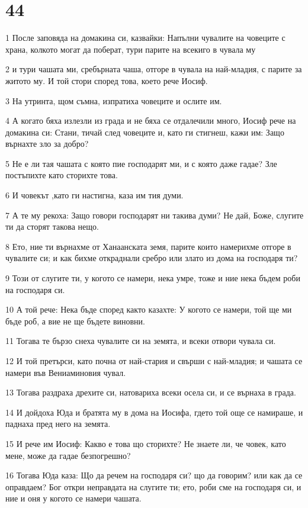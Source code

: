 \chapter{44}

\par 1 После заповяда на домакина си, казвайки: Напълни чувалите на човеците с храна, колкото могат да поберат, тури парите на всекиго в чувала му
\par 2 и тури чашата ми, сребърната чаша, отгоре в чувала на най-младия, с парите за житото му. И той стори според това, което рече Иосиф.
\par 3 На утринта, щом съмна, изпратиха човеците и ослите им.
\par 4 А когато бяха излезли из града и не бяха се отдалечили много, Иосиф рече на домакина си: Стани, тичай след човеците и, като ги стигнеш, кажи им: Защо върнахте зло за добро?
\par 5 Не е ли тая чашата с която пие господарят ми, и с която даже гадае? Зле постъпихте като сторихте това.
\par 6 И човекът ,като ги настигна, каза им тия думи.
\par 7 А те му рекоха: Защо говори господарят ни такива думи? Не дай, Боже, слугите ти да сторят такова нещо.
\par 8 Ето, ние ти върнахме от Ханаанската земя, парите които намерихме отгоре в чувалите си; и как бихме откраднали сребро или злато из дома на господаря ти?
\par 9 Този от слугите ти, у когото се намери, нека умре, тоже и ние нека бъдем роби на господаря си.
\par 10 А той рече: Нека бъде според както казахте: У когото се намери, той ще ми бъде роб, а вие не ще бъдете виновни.
\par 11 Тогава те бързо снеха чувалите си на земята, и всеки отвори чувала си.
\par 12 И той претърси, като почна от най-стария и свърши с най-младия; и чашата се намери във Вениаминовия чувал.
\par 13 Тогава раздраха дрехите си, натовариха всеки осела си, и се върнаха в града.
\par 14 И дойдоха Юда и братята му в дома на Иосифа, гдето той още се намираше, и паднаха пред него на земята.
\par 15 И рече им Иосиф: Какво е това що сторихте? Не знаете ли, че човек, като мене, може да гадае безпогрешно?
\par 16 Тогава Юда каза: Що да речем на господаря си? що да говорим? или как да се оправдаем? Бог откри неправдата на слугите ти; ето, роби сме на господаря си, и ние и оня у когото се намери чашата.
